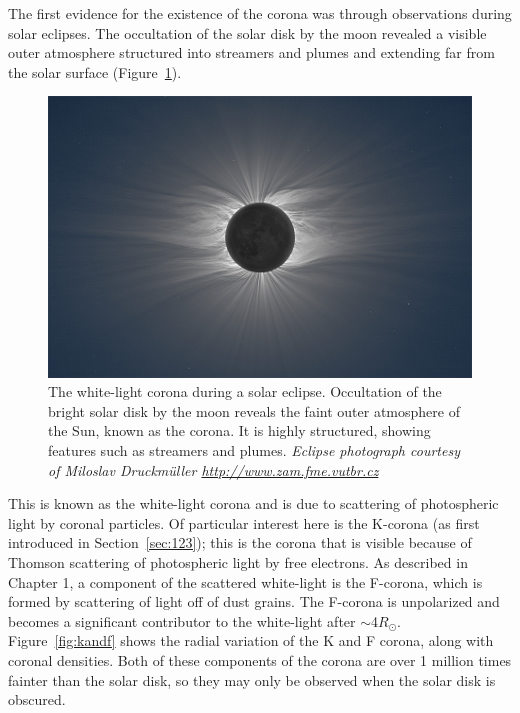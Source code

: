 The first evidence for the existence of the corona was through observations during solar eclipses. The occultation of the solar disk by the moon revealed a visible outer atmosphere structured into streamers and plumes and extending far from the solar surface (Figure~\ref{fig:seclipse}). 
\begin{figure}[!t]
\begin{center}
\includegraphics[scale=0.45]{images/solar_eclipse}
\caption[White-light corona during an eclipse]{The white-light corona during a solar eclipse. Occultation of the bright solar disk by the moon reveals the faint outer atmosphere of the Sun, known as the corona. It is highly structured, showing features such as streamers and plumes. {\it Eclipse photograph courtesy of Miloslav Druckm\"{u}ller \href{http://www.zam.fme.vutbr.cz/~druck/Index.htm}{http://www.zam.fme.vutbr.cz}}}
\label{fig:seclipse}
\end{center}
\end{figure}
This is known as the white-light corona and is due to scattering of photospheric light by coronal particles. Of particular interest here is the K-corona (as first introduced in Section~\ref{sec:123}); this is the corona that is visible because of Thomson scattering of photospheric light by free electrons. As described in Chapter 1, a component of the scattered white-light is the F-corona, which is formed by scattering of light off of dust grains. The F-corona is unpolarized and becomes a significant contributor to the white-light after $\sim$4$R_{\odot}$. Figure~\ref{fig:kandf} shows the radial variation of the K and F corona, along with coronal densities. Both of these components of the corona are over 1 million times fainter than the solar disk, so they may only be observed when the solar disk is obscured.

